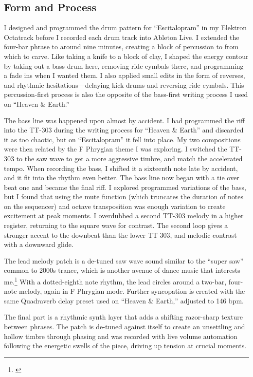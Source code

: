 \documentclass[12pt,twoside]{reedthesis}
\begin{document}
\subsection{Form and Process}

I designed and programmed the drum pattern for ``Escitalopram'' in my Elektron Octatrack before I recorded each drum track into Ableton Live. I extended the four-bar phrase to around nine minutes, creating a block of percussion to from which to carve. Like taking a knife to a block of clay, I shaped the energy contour by taking out a bass drum here, removing ride cymbals there, and programming a fade ins when I wanted them. I also applied small edits in the form of reverses, and rhythmic hesitations---delaying kick drums and reversing ride cymbals. This percussion-first process is also the opposite of the bass-first writing process I used on ``Heaven {\&} Earth.''

The bass line was happened upon almost by accident. I had programmed the riff into the TT-303 during the writing process for ``Heaven {\&} Earth'' and discarded it as too chaotic, but on ``Escitalopram'' it fell into place. My two compositions were then related by the F Phrygian theme I was exploring. I switched the TT-303 to the saw wave to get a more aggressive timbre, and match the accelerated tempo. When recording the bass, I shifted it a sixteenth note late by accident, and it fit into the rhythm even better. The bass line now began with a tie over beat one and became the final riff. I explored programmed variations of the bass, but I found that using the mute function (which truncates the duration of notes on the sequencer) and octave transposition was enough variation to create excitement at peak moments. I overdubbed a second TT-303 melody in a higher register, returning to the square wave for contrast. The second loop gives a stronger accent to the downbeat than the lower TT-303, and melodic contrast with a downward glide. 

The lead melody patch is a de-tuned saw wave sound similar to the ``super saw'' common to 2000s trance, which is another avenue of dance music that interests me.\footnote{\cite{turbodudeDemonstrationRolandJP80002011}}  With a dotted-eighth note rhythm, the lead circles around a two-bar, four-note melody, again in F Phrygian mode. Further syncopation is created with the same Quadraverb delay preset used on ``Heaven {\&} Earth,'' adjusted to 146 bpm.

The final part is a rhythmic synth layer that adds a shifting razor-sharp texture between phrases. The patch is de-tuned against itself to create an unsettling and hollow timbre through phasing and was recorded with live volume automation following the energetic swells of the piece, driving up tension at crucial moments.
\end{document}
